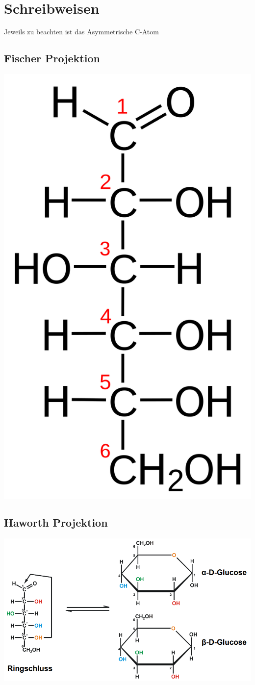 
\section{Schreibweisen}
Jeweils zu beachten ist das Asymmetrische C-Atom
\subsection{Fischer Projektion}
\includegraphics[scale=0.06]{media/naturstoffe/fischer.png}
\subsection{Haworth Projektion}
\includegraphics[scale=0.86]{media/naturstoffe/haworth.png}

